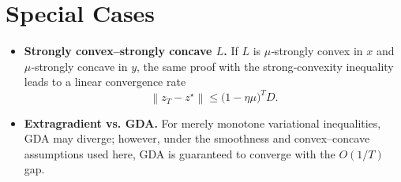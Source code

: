 \documentclass{article}
\newcommand{\norm}[1]{\left\lVert#1\right\rVert}
\begin{document}
\section*{Special Cases}
\begin{itemize}
\item \textbf{Strongly convex–strongly concave $L$.} If $L$ is $\mu$‑strongly convex in $x$ and $\mu$‑strongly concave in $y$, the same proof with the strong‑convexity inequality leads to a linear convergence rate
\[
\norm{z_T-z^\star}\le \bigl(1-\eta\mu\bigr)^T D .
\]
\item \textbf{Extragradient vs. GDA.} For merely monotone variational inequalities, GDA may diverge; however, under the smoothness and convex–concave assumptions used here, GDA is guaranteed to converge with the $O(1/T)$ gap.
\end{itemize}
\end{document}
